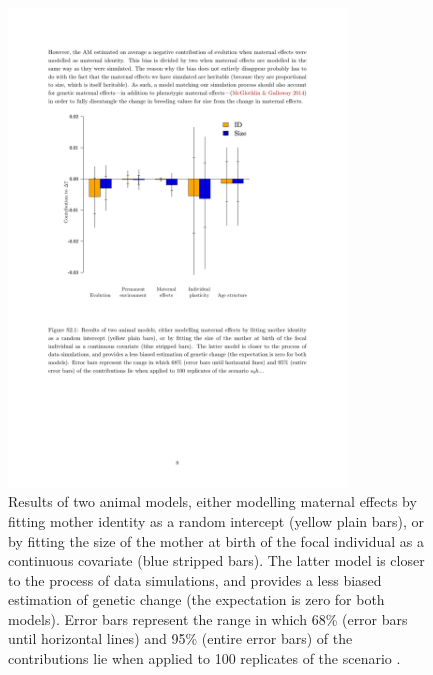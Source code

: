 \begin{figure}[ht]
\centering
	\includegraphics[width=0.8\textwidth]{Appendices/FigS3}
    \caption{\footnotesize Results of two animal models, either modelling maternal effects by fitting mother identity as a random intercept (yellow plain bars), or by fitting the size of the mother at birth of the focal individual as a continuous covariate (blue stripped bars). The latter model is closer to the process of data simulations, and provides a less biased estimation of genetic change (the expectation is zero for both models). Error bars represent the range in which 68\% (error bars until horizontal lines) and 95\% (entire error bars) of the contributions lie when applied to 100 replicates of the scenario \sh.}
    \label{app:AM:IDvsSize}
\end{figure}